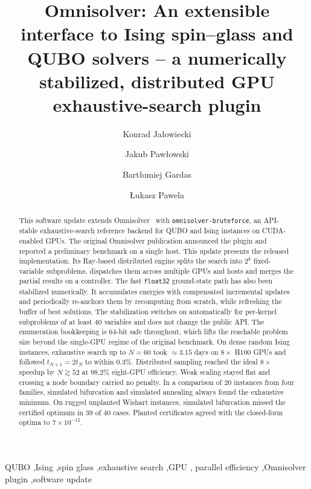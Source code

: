 \documentclass[preprint,12pt,a4paper]{elsarticle}
\begin{document}
\begin{frontmatter}

\title{Omnisolver: An extensible interface to Ising spin--glass and QUBO
solvers -- a numerically stabilized, distributed GPU exhaustive-search plugin}

\author[1]{Konrad Ja\l{}owiecki}
\author[2,3]{Jakub Paw{\l}owski}
\author[1,2]{Bart{\l}omiej Gardas}
\author[1,2]{{\L}ukasz Pawela}

\address[1]{Institute of Theoretical and Applied Informatics, Polish Academy
of Sciences, Ba{\l}tycka 5, 44-100 Gliwice, Poland}

\address[2]{Quantumz.io Sp. z o. o., Pu{\l}awska 12/3, 02-566 Warsaw, Poland}

\address[3]{Institute of Theoretical Physics, Faculty of Fundamental Problems
of Technology, Wroc{\l}aw University of Science and Technology,
50-370 Wroc{\l}aw, Poland}

\begin{abstract}
This software update extends Omnisolver~\cite{jalowiecki2021omnisolver} with
\texttt{omnisolver-bruteforce}, an API-stable exhaustive-search reference
backend for QUBO and Ising instances on CUDA-enabled GPUs. The original
Omnisolver publication announced the plugin and reported a preliminary benchmark
on a single host. This update presents the released implementation. Its
Ray-based distributed engine splits the search into $2^{k}$ fixed-variable
subproblems, dispatches them across multiple GPUs and hosts and merges the
partial results on a controller. The fast \texttt{float32} ground-state path has
also been stabilized numerically. It accumulates energies with compensated
incremental updates and periodically re-anchors them by recomputing from
scratch, while refreshing the buffer of best solutions. The stabilization
switches on automatically for per-kernel subproblems of at least $40$ variables
and does not change the public API. The enumeration bookkeeping is 64-bit safe
throughout, which lifts the reachable problem size beyond the single-GPU regime
of the original benchmark. On dense random Ising instances, exhaustive search up
to \(N=60\) took \(\approx 3.15\) days on \(8\times\) H100 GPUs and followed
\(t_{N+1}=2t_N\) to within \(0.3\%\). Distributed sampling reached the ideal
\(8\times\) speedup by \(N\gtrsim 52\) at \(98.2\%\) eight-GPU efficiency. Weak
scaling stayed flat and crossing a node boundary carried no penalty. In a
comparison of 20 instances from four families, simulated bifurcation and
simulated annealing always found the exhaustive minimum. On rugged unplanted
Wishart instances, simulated bifurcation missed the certified optimum in 39 of
40 cases. Planted certificates agreed with the closed-form optima to
\(7\times10^{-15}\).
\end{abstract}

\begin{keyword}
QUBO \sep Ising \sep spin glass \sep exhaustive search \sep GPU \sep
parallel efficiency \sep Omnisolver plugin \sep software update
\end{keyword}

\end{frontmatter}
\end{document}
